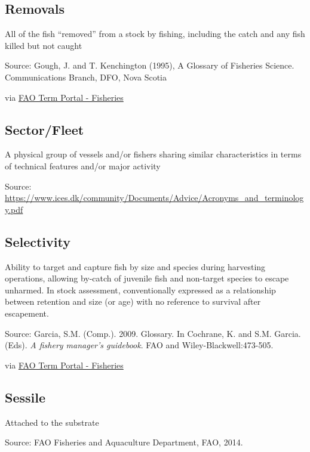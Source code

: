 \documentclass[
  11pt,
]{book}
\begin{document}
\hypertarget{removals}{%
\subsection{Removals}\label{removals}}

All of the fish ``removed'' from a stock by fishing, including the catch and any fish killed but not caught

Source: Gough, J. and T. Kenchington (1995), A Glossary of Fisheries Science. Communications Branch, DFO, Nova Scotia

via \href{http://www.fao.org/fishery/glossary/en}{FAO Term Portal - Fisheries}

\hypertarget{sectorfleet}{%
\subsection{Sector/Fleet}\label{sectorfleet}}

A physical group of vessels and/or fishers sharing similar characteristics in terms of technical features and/or major activity

Source: \url{https://www.ices.dk/community/Documents/Advice/Acronyms_and_terminology.pdf}

\hypertarget{selectivity}{%
\subsection{Selectivity}\label{selectivity}}

Ability to target and capture fish by size and species during harvesting operations, allowing by-catch of juvenile fish and non-target species to escape unharmed. In stock assessment, conventionally expressed as a relationship between retention and size (or age) with no reference to survival after escapement.

Source: Garcia, S.M. (Comp.). 2009. Glossary. In Cochrane, K. and S.M. Garcia. (Eds). \emph{A fishery manager's guidebook}. FAO and Wiley-Blackwell:473-505.

via \href{http://www.fao.org/fishery/glossary/en}{FAO Term Portal - Fisheries}

\hypertarget{sessile}{%
\subsection{Sessile}\label{sessile}}

Attached to the substrate

Source: FAO Fisheries and Aquaculture Department, FAO, 2014.
\end{document}

